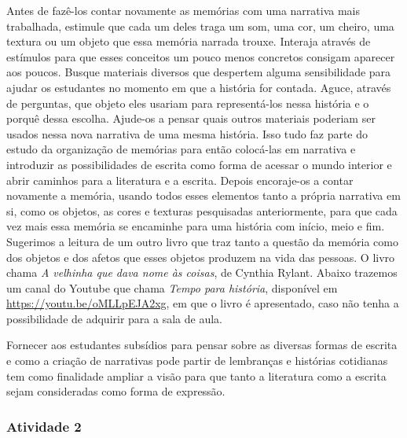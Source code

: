 \documentclass[11pt]{extarticle}
\begin{document}

Antes de fazê-los contar novamente as memórias com uma narrativa mais trabalhada, estimule que cada um deles traga um som, uma cor, um cheiro, uma textura ou um objeto que essa memória narrada trouxe. Interaja através de estímulos para que esses conceitos um pouco menos concretos consigam aparecer aos poucos. Busque materiais diversos que despertem alguma sensibilidade para ajudar os estudantes no momento em que a história for contada. Aguce, através de perguntas, que objeto eles usariam para representá-los nessa história e o porquê dessa escolha. Ajude-os a pensar quais outros materiais poderiam ser usados nessa nova narrativa de uma mesma história. Isso tudo faz parte do estudo da organização de memórias para então colocá-las em narrativa e introduzir as possibilidades de escrita como forma de acessar o mundo interior e abrir caminhos para a literatura e a escrita. Depois encoraje-os a contar novamente a memória, usando todos esses elementos tanto a própria narrativa em si, como os objetos, as cores e texturas pesquisadas anteriormente, para que cada vez mais essa memória se encaminhe para uma história com início, meio e fim. Sugerimos a leitura de um outro livro que traz tanto a questão da memória como dos objetos e dos afetos que esses objetos produzem na vida das pessoas. O livro chama \textit{A velhinha que dava nome às coisas}, de Cynthia Rylant. Abaixo trazemos um canal do Youtube que chama \textit{Tempo para história}, disponível em \url{https://youtu.be/oMLLpEJA2xg}, em que o livro é apresentado, caso não tenha a possibilidade de adquirir para a sala de aula. 


Fornecer aos estudantes subsídios para pensar sobre as diversas formas de escrita e como a criação de narrativas pode partir de lembranças e histórias cotidianas tem como finalidade ampliar a visão para que tanto a literatura como a escrita sejam consideradas como forma de expressão.

\subsubsection{Atividade 2}

\end{document}
